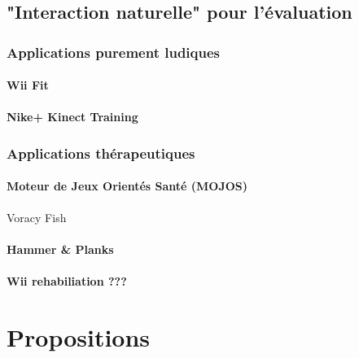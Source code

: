 \documentclass[french,12pt]{report}
\begin{document}
  
  \section{"Interaction naturelle" pour l'évaluation}
		
  \subsection{Applications purement ludiques}
  
  \subsubsection{Wii Fit}
  \subsubsection{Nike+ Kinect Training}
  
  
  \subsection{Applications thérapeutiques}

  \subsubsection{Moteur de Jeux Orientés Santé (MOJOS)}
  Voracy Fish
  
  \subsubsection{Hammer \& Planks}
  
  \subsubsection{Wii rehabiliation ??? }
	
	
	\chapter{Propositions}
	
\end{document}
